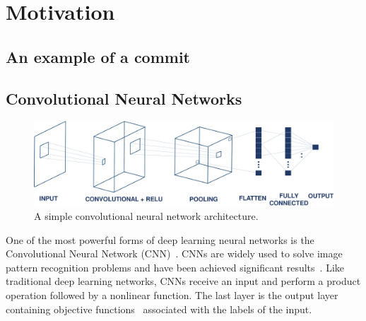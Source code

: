 
\section{Motivation}
\label{sec:motivation}

\subsection{An example of a commit }
\label{sec:examle}

\subsection{Convolutional Neural Networks}
\label{sec:background_cnn}
\begin{figure}[t!]
\center
\includegraphics[scale=0.3]{figs/cnn.pdf}
\caption{A simple convolutional neural network architecture.}
\label{fig:cnn}
\end{figure}

One of the most powerful forms of deep learning neural networks is the Convolutional Neural Network (CNN)~\cite{lecun2015deep}. CNNs are widely used to solve image pattern recognition problems and have been achieved significant results~\cite{karpathy2014large, lawrence1997face, krizhevsky2012imagenet}. Like traditional deep learning networks, CNNs receive an input and perform a product operation followed by a nonlinear function. The last layer is the output layer containing objective functions~\cite{zhao2017loss} associated with the labels of the input.



